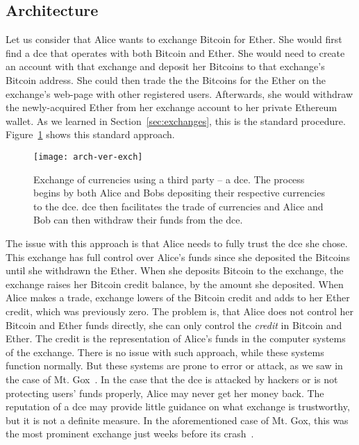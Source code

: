 \subsection{Architecture}
% 
Let us consider that Alice wants to exchange Bitcoin for Ether. She would first find a \acrfull{dce} that operates with both Bitcoin and Ether. She would need to create an account with that exchange and deposit her Bitcoins to that exchange's Bitcoin address. She could then trade the the Bitcoins for the Ether on the exchange's web-page with other registered users. Afterwards, she would withdraw the newly-acquired Ether from her exchange account to her private Ethereum wallet. As we learned in Section~\ref{sec:exchanges}, this is the standard procedure. Figure~\ref{fig:arch-ver-exch} shows this standard approach.

\begin{figure}[ht]
    \centering
    \texttt{[image: arch-ver-exch]}
    \caption{Exchange of currencies using a third party -- a \acrfull{dce}. The process begins by both Alice and Bobs depositing their respective currencies to the \acrshort{dce}. \acrshort{dce} then facilitates the trade of currencies and Alice and Bob can then withdraw their funds from the \acrshort{dce}.}
    \label{fig:arch-ver-exch}
\end{figure}
% 
The issue with this approach is that Alice needs to fully trust the \acrshort{dce} she chose. This exchange has full control over Alice's funds since she deposited the Bitcoins until she withdrawn the Ether. When she deposits Bitcoin to the exchange, the exchange raises her Bitcoin credit balance, by the amount she deposited. When Alice makes a trade, exchange lowers of the Bitcoin credit and adds to her Ether credit, which was previously zero. The problem is, that Alice does not control her Bitcoin and Ether funds directly, she can only control the \textit{credit} in Bitcoin and Ether. The credit is the representation of Alice's funds in the computer systems of the exchange. There is no issue with such approach, while these systems function normally. But these systems are prone to error or attack, as we saw in the case of Mt. Gox~\cite{Popper2014ApparentTimes}. In the case that the \acrshort{dce} is attacked by hackers or is not protecting users' funds properly, Alice may never get her money back. The reputation of a \acrshort{dce} may provide little guidance on what exchange is trustworthy, but it is not a definite measure. In the aforementioned case of Mt. Gox, this was the most prominent exchange just weeks before its crash~\cite{Popper2014ApparentTimes}.

